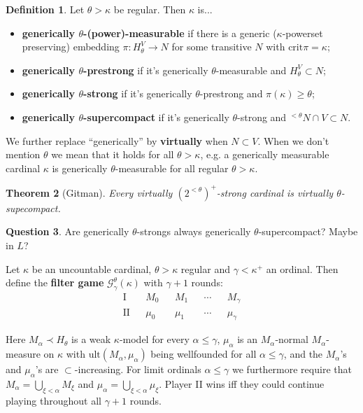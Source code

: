 \documentclass{amsart}
\newtheorem{theorem}{Theorem}[section]
\theoremstyle{definition}
\newtheorem{definition}[theorem]{Definition}
\newtheorem{question}[theorem]{Question}
\newcommand{\crit}{\text{crit}}
\newcommand{\G}{\mathcal G}
\newcommand{\ult}{\mathrm{ult}}
\begin{document}
\begin{definition}
  Let $\theta>\kappa$ be regular. Then $\kappa$ is...
  \begin{itemize}
    \item \textbf{generically $\theta$-(power)-measurable} if there is a generic ($\kappa$-powerset preserving) embedding $\pi:H_\theta^V\to N$ for some transitive $N$ with $\crit\pi=\kappa$;
    \item \textbf{generically $\theta$-prestrong} if it's generically $\theta$-measurable and $H_\theta^V\subset N$;
    \item \textbf{generically $\theta$-strong} if it's generically $\theta$-prestrong and $\pi(\kappa)\geq\theta$;
    \item \textbf{generically $\theta$-supercompact} if it's generically $\theta$-strong and ${^{<\theta}} N\cap V\subset N$.\\
  \end{itemize}

  We further replace ``generically'' by \textbf{virtually} when $N\subset V$. When we don't mention $\theta$ we mean that it holds for all $\theta>\kappa$, e.g. a generically measurable cardinal $\kappa$ is generically $\theta$-measurable for all regular $\theta>\kappa$.
\end{definition}

\begin{theorem}[Gitman]
  Every virtually $(2^{<\theta})^+$-strong cardinal is virtually $\theta$-supecompact.
\end{theorem}

\begin{question} 
Are generically $\theta$-strongs always generically $\theta$-supercompact? Maybe in $L$? 
\end{question} 

  Let $\kappa$ be an uncountable cardinal, $\theta>\kappa$ regular and $\gamma<\kappa^+$ an ordinal. Then define the \textbf{filter game} $\G^\theta_\gamma(\kappa)$ with $\gamma{+}1$ rounds:
  \[
    \begin{array}{cccccccccc}
      \text{I} && M_0 && M_1 && \cdots && M_\gamma\\
      \text{II} && \mu_0 && \mu_1 && \cdots && \mu_\gamma
    \end{array}
  \]

  Here $M_\alpha\prec H_\theta$ is a weak $\kappa$-model for every $\alpha\leq\gamma$, $\mu_\alpha$ is an $M_\alpha$-normal $M_\alpha$-measure on $\kappa$ with $\ult(M_\alpha,\mu_\alpha)$ being wellfounded for all $\alpha\leq\gamma$, and the $M_\alpha$'s and $\mu_\alpha$'s are $\subset$-increasing. For limit ordinals $\alpha\leq\gamma$ we furthermore require that $M_\alpha=\bigcup_{\xi<\alpha}M_\xi$ and $\mu_\alpha=\bigcup_{\xi<\alpha}\mu_\xi$. Player II wins iff they could continue playing throughout all $\gamma{+}1$ rounds.
\end{document}
